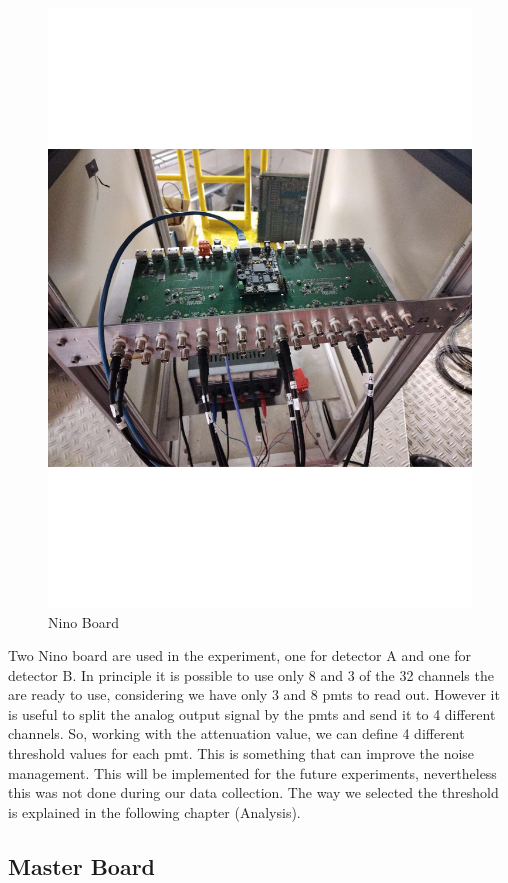 \begin{figure}[hbtp]
 
 \centering
 \includegraphics[scale= 0.4]{figures/NINO.pdf}
 \caption{Nino Board}
 \label{fig:NinoBoard}
 \end{figure}

Two Nino board are used in the experiment, one for detector A and one for detector B. In principle it is possible to use only 8 and 3 of the 32 channels the are ready to use, considering we have only 3 and 8 pmts to read out. However it is useful to split the analog output signal by the pmts and send it to 4 different channels. So, working with the attenuation value, we can define 4 different threshold values for each pmt. This is something that can improve the noise management. This will be implemented for the future experiments, nevertheless this was not done during our data collection.
The way we selected the threshold is explained in the following chapter (Analysis).

\subsection{Master Board}